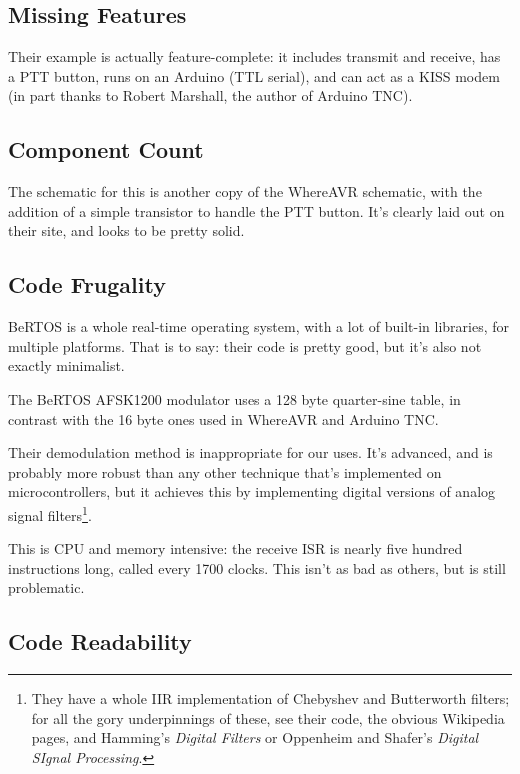 \subsection{Missing Features}

Their example is actually feature-complete: it includes transmit and
receive, has a PTT button, runs on an Arduino (TTL serial), and can
act as a KISS modem (in part thanks to Robert Marshall, the author of
Arduino TNC).


\subsection{Component Count}

The schematic for this is another copy of the WhereAVR schematic, with
the addition of a simple transistor to handle the PTT button.  It's
clearly laid out on their site, and looks to be pretty solid.

\subsection{Code Frugality}

BeRTOS is a whole real-time operating system, with a lot of built-in
libraries, for multiple platforms.  That is to say: their code is
pretty good, but it's also not exactly minimalist.

The BeRTOS AFSK1200 modulator uses a 128 byte quarter-sine table, in
contrast with the 16 byte ones used in WhereAVR and Arduino TNC.

Their demodulation method is inappropriate for our uses.
It's advanced, and is probably more robust than any other technique
that's implemented on microcontrollers, but it achieves this by
implementing digital versions of analog signal filters\footnote{They
  have a whole IIR implementation of Chebyshev and Butterworth
  filters; for all the gory underpinnings of these, see their code,
  the obvious Wikipedia pages, and Hamming's \textit{Digital
    Filters}\cite{HammingDigitalFilters} or Oppenheim and Shafer's
  \textit{Digital SIgnal Processing}\cite{OppenhiemSchaferDSP}.}.

This is CPU and memory intensive: the receive ISR is nearly five
hundred instructions long, called every 1700 clocks.  This isn't as
bad as others, but is still problematic.

\subsection{Code Readability}

